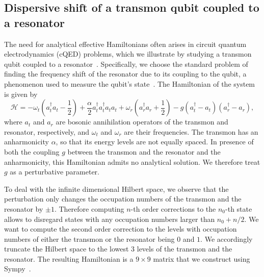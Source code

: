 \subsection{Dispersive shift of a transmon qubit coupled to a resonator}
\label{sec:cqed}

The need for analytical effective Hamiltonians often arises in circuit quantum electrodynamics (cQED) problems, which we illustrate by studying a transmon qubit coupled to a resonator~\cite{Krantz_2019}.
Specifically, we choose the standard problem of finding the frequency shift of the resonator due to its coupling to the qubit, a phenomenon used to measure the qubit's state~\cite{Blais_2004}.
The Hamiltonian of the system is given by
%
\begin{equation}
    \label{eq:H_cqed}
    \mathcal{H} =
    -\omega_t (a^{\dagger}_{t} a_{t} - \frac{1}{2})
    + \frac{\alpha}{2} a^{\dagger}_{t} a^{\dagger}_{t} a_{t} a_{t} +
    \omega_r (a^{\dagger}_{r} a_{r} + \frac{1}{2}) -
    g (a^{\dagger}_{t} - a_{t}) (a^{\dagger}_{r} - a_{r}),
\end{equation}
%
where $a_t$ and $a_r$ are bosonic annihilation operators of the transmon and resonator, respectively, and $\omega_t$ and $\omega_r$ are their frequencies.
The transmon has an anharmonicity $\alpha$, so that its energy levels are not equally spaced.
In presence of both the coupling $g$ between the transmon and the resonator and the anharmonicity, this Hamiltonian admits no analytical solution.
We therefore treat $g$ as a perturbative parameter.

To deal with the infinite dimensional Hilbert space, we observe that the perturbation only changes the occupation numbers of the transmon and the resonator by $\pm 1$.
Therefore computing $n$-th order corrections to the $n_0$-th state allows to disregard states with any occupation numbers larger than $n_0 + n/2$.
We want to compute the second order correction to the levels with occupation numbers of either the transmon or the resonator being $0$ and $1$.
We accordingly truncate the Hilbert space to the lowest 3 levels of the transmon and the resonator.
The resulting Hamiltonian is a $9 \times 9$ matrix that we construct using Sympy~\cite{Meurer_2017}.

